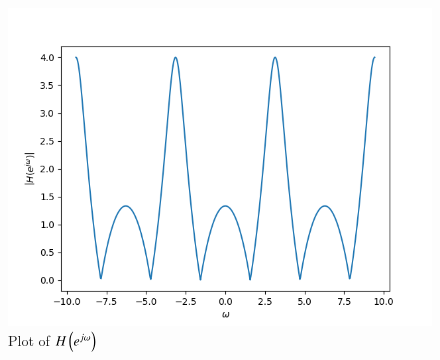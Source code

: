 \documentclass[journal,12pt,twocolumn]{IEEEtran}
\theoremstyle{remark}
\begin{document}
\begin{enumerate}[label=\thesection.\arabic*]
\begin{figure}[ht]
    \includegraphics[width=0.8\columnwidth]{figs/H_jw.png}
    \caption{Plot of $H\left(e^{j\omega}\right)$}
\end{figure}
\end{enumerate}
\end{document}
